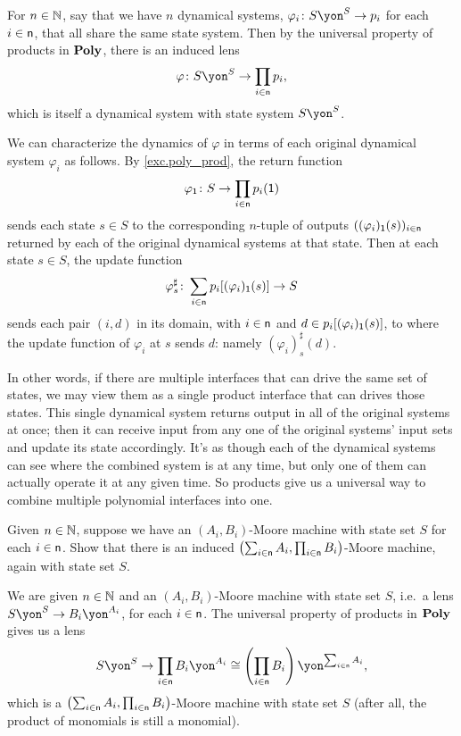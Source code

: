 \documentclass[Book-Poly]{subfiles}
\begin{document}
For $n\in\mathbb{N}$, say that we have $n$ dynamical systems, $\varphi_i\colon S\yon^S\to p_i$ for each $i\in\mathsf{n}$, that all share the same state system.
Then by the universal property of products in $\mathbf{Poly}$, there is an induced lens \[\varphi\colon S\yon^S\to\prod_{i\in\ord{n}}p_i,\] which is itself a dynamical system with state system $S\yon^S$.

We can characterize the dynamics of $\varphi$ in terms of each original dynamical system $\varphi_i$ as follows.
By \cref{exc.poly_prod}, the return function \[\varphi_{\textsf{1}}\colon S\to\prod_{i\in\mathsf{n}}p_i(\textsf{1})\] sends each state $s\in S$ to the corresponding $n$-tuple of outputs $((\varphi_i)_{\textsf{1}}(s))_{i\in\mathsf{n}}$ returned by each of the original dynamical systems at that state.
Then at each state $s\in S$, the update function \[\varphi^\sharp_s\colon\sum_{i\in\mathsf{n}}p_i[(\varphi_i)_{\textsf{1}}(s)]\to S\] sends each pair $(i,d)$ in its domain, with $i\in\mathsf{n}$ and $d\in p_i[(\varphi_i)_{\textsf{1}}(s)]$, to where the update function of $\varphi_i$ at $s$ sends $d$: namely $(\varphi_i)^\sharp_s(d)$.

In other words, if there are multiple interfaces that can drive the same set of states, we may view them as a single product interface that can drives those states.
This single dynamical system returns output in all of the original systems at once; then it can receive input from any one of the original systems' input sets and update its state accordingly.
It's as though each of the dynamical systems can see where the combined system is at any time, but only one of them can actually operate it at any given time.
So products give us a universal way to combine multiple polynomial interfaces into one.

\begin{exercise}
Given $n\in\mathbb{N}$, suppose we have an $(A_i,B_i)$-Moore machine with state set $S$ for each $i \in \mathsf{n}$.
Show that there is an induced $\left(\sum_{i \in \mathsf{n}} A_i, \prod_{i \in \mathsf{n}} B_i\right)$-Moore machine, again with state set $S$.
\begin{solution}
We are given $n\in\mathbb{N}$ and an $(A_i,B_i)$-Moore machine with state set $S$, i.e.\ a lens $S\yon^S\to B_i\yon^{A_i}$, for each $i\in\mathsf{n}$.
The universal property of products in $\mathbf{Poly}$ gives us a lens
\[
    S\yon^S\to\prod_{i\in\ord{n}}B_i\yon^{A_i}\iso\left(\prod_{i\in\ord{n}}B_i\right)\yon^{\sum_{i\in\ord{n}}A_i},
\]
which is a $\left(\sum_{i \in \mathsf{n}} A_i, \prod_{i \in \mathsf{n}} B_i\right)$-Moore machine with state set $S$ (after all, the product of monomials is still a monomial).
\end{solution}
\end{exercise}
\end{document}
